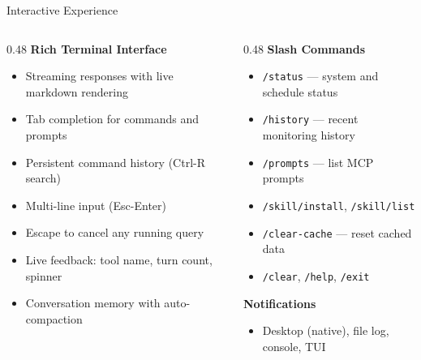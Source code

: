 \documentclass[aspectratio=169,10pt]{beamer}
\begin{document}
\begin{frame}{Interactive Experience}
\begin{columns}[T]
\begin{column}{0.48\textwidth}
\textbf{Rich Terminal Interface}
\begin{itemize}\scriptsize
  \item Streaming responses with live markdown rendering
  \item Tab completion for commands and prompts
  \item Persistent command history (Ctrl-R search)
  \item Multi-line input (Esc-Enter)
  \item Escape to cancel any running query
  \item Live feedback: tool name, turn count, spinner
  \item Conversation memory with auto-compaction
\end{itemize}
\end{column}
\begin{column}{0.48\textwidth}
\textbf{Slash Commands}
\begin{itemize}\scriptsize
  \item \texttt{/status} --- system and schedule status
  \item \texttt{/history} --- recent monitoring history
  \item \texttt{/prompts} --- list MCP prompts
  \item \texttt{/skill/install}, \texttt{/skill/list}
  \item \texttt{/clear-cache} --- reset cached data
  \item \texttt{/clear}, \texttt{/help}, \texttt{/exit}
\end{itemize}

\smallskip
\textbf{Notifications}
\begin{itemize}\scriptsize
  \item Desktop (native), file log, console, TUI
\end{itemize}
\end{column}
\end{columns}
\end{frame}
\end{document}
